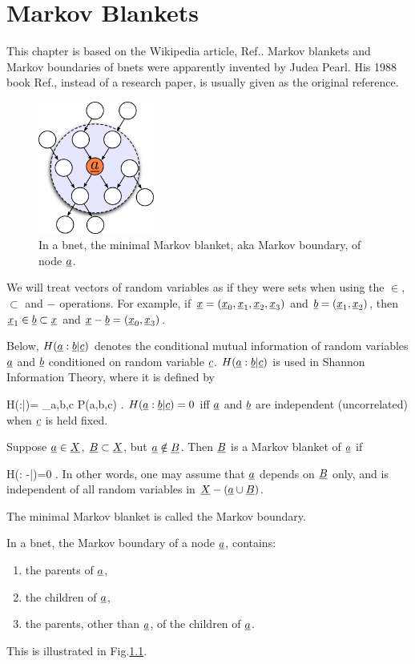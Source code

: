\chapter{Markov Blankets}\label{ch-mblanket}


This chapter is based on the
Wikipedia article, 
Ref.\cite{wiki-mblanket}.
Markov blankets
and Markov boundaries of bnets
were apparently invented
by Judea Pearl. His 1988 book
 Ref.\cite{pearl-1988book},
instead of a research paper, is 
usually given as the original reference.

\begin{figure}[h!]
\centering
\includegraphics[width=1.5in]{mblanket/mblanket.png}
\caption{In a bnet,
the minimal Markov blanket,
aka Markov boundary,
of node ${\underline{a}}$.} 
\label{fig-mblanket}
\end{figure}

We will treat vectors 
of random variables as if
they were sets when using the $\in$,
$\subset$ and $-$ operations.
For example,
if ${\underline{x}}=({\underline{x}}_0, 
{\underline{x}}_1, {\underline{x}}_2,
{\underline{x}}_3)$ and
${\underline{b}}=({\underline{x}}_1, {\underline{x}}_2)$,
then ${\underline{x}}_1\in {\underline{b}}\subset {\underline{x}}$ and
${\underline{x}}-{\underline{b}}=({\underline{x}}_0, {\underline{x}}_3)$.

Below, $H({\underline{a}}:{\underline{b}}|{\underline{c}})$
denotes the conditional
mutual information of
random variables
${\underline{a}}$ and ${\underline{b}}$
conditioned on 
random variable ${\underline{c}}$.
$H({\underline{a}}:{\underline{b}}|{\underline{c}})$
is used in Shannon Information
Theory, where it is defined by

\beq
H(\rva:\rvb|\rvc)=
\sum_{a,b,c}
P(a,b,c)\ln 
{}
\;.
\eeq
$H({\underline{a}}:{\underline{b}}|{\underline{c}})=0$
iff ${\underline{a}}$ and ${\underline{b}}$
are independent (uncorrelated)
when ${\underline{c}}$ is held fixed.



Suppose
${\underline{a}}\in  {\underline{X}}$,
 ${\underline{B}}\subset {\underline{X}}$,
but ${\underline{a}}\notin{\underline{B}}$.
Then ${\underline{B}}$ is a Markov blanket
of ${\underline{a}}$ if

\beq
H(\rva: \rvX-\rva|\rvB)=0
\;.
\eeq
In other words, one may assume that
${\underline{a}}$ depends on ${\underline{B}}$ only, 
and is independent of all random
variables in ${\underline{X}}-({\underline{a}}\cup{\underline{B}})$.

The minimal Markov blanket 
is called the Markov boundary.

In a bnet, the Markov boundary
of a node ${\underline{a}}$,
contains:
\begin{enumerate}
\item
the parents of ${\underline{a}}$,
\item
the children of ${\underline{a}}$,
\item
the parents, other than ${\underline{a}}$,
of the children of ${\underline{a}}$.
\end{enumerate}
This is illustrated in 
Fig.\ref{fig-mblanket}.